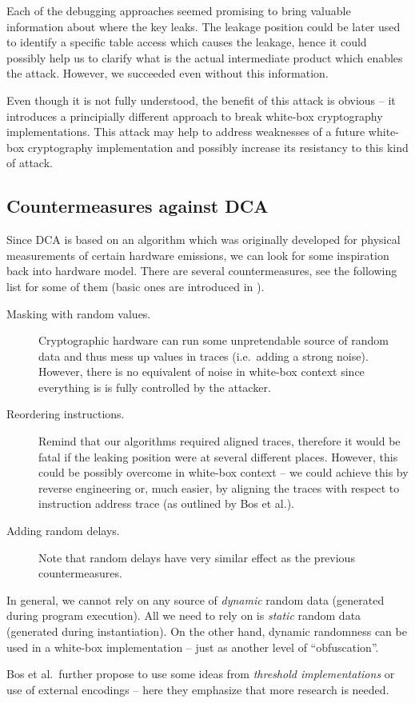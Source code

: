 Each of the debugging approaches seemed promising to bring valuable information about where the key leaks. The leakage position could be later used to identify a specific table access which causes the leakage, hence it could possibly help us to clarify what is the actual intermediate product which enables the attack. However, we succeeded even without this information.

Even though it is not fully understood, the benefit of this attack is obvious -- it introduces a principially different approach to break white-box cryptography implementations. This attack may help to address weaknesses of a future white-box cryptography implementation and possibly increase its resistancy to this kind of attack.



\subsection{Countermeasures against DCA}

Since DCA is based on an algorithm which was originally developed for physical measurements of certain hardware emissions, we can look for some inspiration back into hardware model. There are several countermeasures, see the following list for some of them (basic ones are introduced in \cite{chari1999towards,goubin1999des}).
\begin{description}
	\item[Masking with random values.] Cryptographic hardware can run some unpretendable source of random data and thus mess up values in traces (i.e.\ adding a strong noise). However, there is no equivalent of noise in white-box context since everything is is fully controlled by the attacker.
	\item[Reordering instructions.] Remind that our algorithms required aligned traces, therefore it would be fatal if the leaking position were at several different places. However, this could be possibly overcome in white-box context -- we could achieve this by reverse engineering or, much easier, by aligning the traces with respect to instruction address trace (as outlined by Bos et al.).
	\item[Adding random delays.] Note that random delays have very similar effect as the previous countermeasures.
\end{description}
In general, we cannot rely on any source of {\em dynamic} random data (generated during program execution). All we need to rely on is {\em static} random data (generated during instantiation). On the other hand, dynamic randomness can be used in a white-box implementation -- just as another level of ``obfuscation''.

Bos et al.\ further propose to use some ideas from {\em threshold implementations} \cite{nikova2006threshold} or use of external encodings -- here they emphasize that more research is needed.
